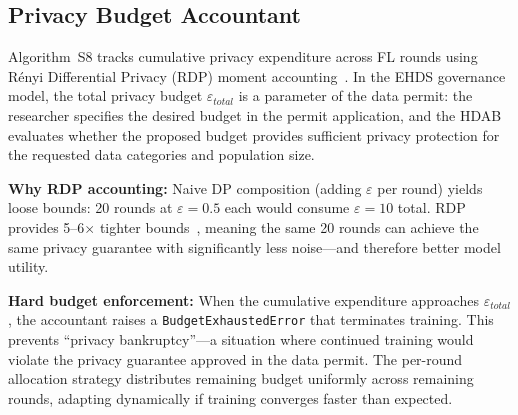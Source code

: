 \documentclass[conference,a4paper]{IEEEtran}
\begin{document}
\subsection{Privacy Budget Accountant}

Algorithm~S8 tracks cumulative privacy expenditure across FL rounds using R\'enyi Differential Privacy (RDP) moment accounting~\cite{mironov2017renyi}. In the EHDS governance model, the total privacy budget $\varepsilon_{total}$ is a parameter of the data permit: the researcher specifies the desired budget in the permit application, and the HDAB evaluates whether the proposed budget provides sufficient privacy protection for the requested data categories and population size.

\textbf{Why RDP accounting:} Naive DP composition (adding $\varepsilon$ per round) yields loose bounds: 20 rounds at $\varepsilon{=}0.5$ each would consume $\varepsilon{=}10$ total. RDP provides 5--6$\times$ tighter bounds~\cite{mironov2017renyi, wei2020federated}, meaning the same 20 rounds can achieve the same privacy guarantee with significantly less noise---and therefore better model utility.

\textbf{Hard budget enforcement:} When the cumulative expenditure approaches $\varepsilon_{total}$, the accountant raises a \texttt{BudgetExhaustedError} that terminates training. This prevents ``privacy bankruptcy''---a situation where continued training would violate the privacy guarantee approved in the data permit. The per-round allocation strategy distributes remaining budget uniformly across remaining rounds, adapting dynamically if training converges faster than expected.
\end{document}
